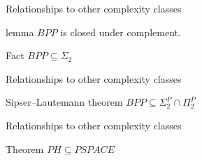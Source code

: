         

        \begin{frame}{Relationships to other complexity classes}
            \begin{block}{lemma}
                $BPP$ is closed under complement.
            \end{block}
            
            \begin{block}{Fact}
                $BPP \subseteq \Sigma_2$
            \end{block}
        \end{frame}
                
        \begin{frame}{Relationships to other complexity classes}
            \begin{block}{Sipser–Lautemann theorem}
                $BPP \subseteq \Sigma_2^P \cap \Pi_2^P$
            \end{block}
        \end{frame}
        
        \begin{frame}{Relationships to other  complexity classes}
            \begin{block}{Theorem}
                $PH \subseteq PSPACE$
            \end{block}
        \end{frame}

